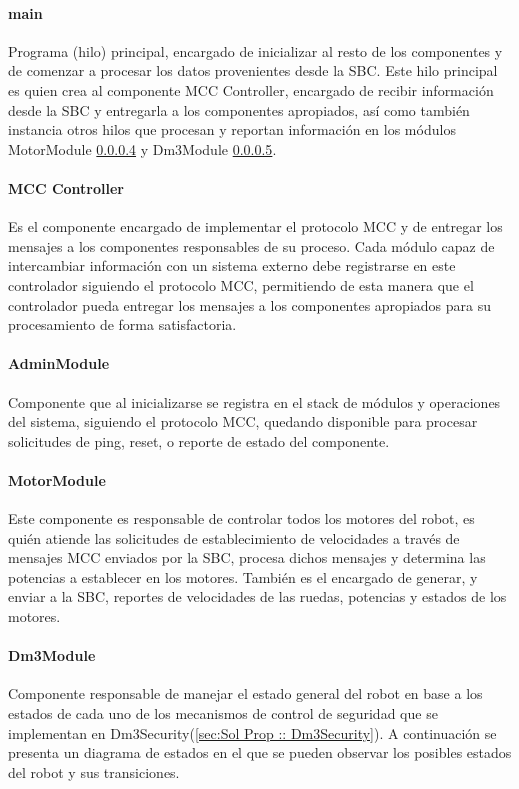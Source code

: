 \documentclass[withindex,glossary]{cam-thesis}
\begin{document}
\paragraph{main}
Programa (hilo) principal, encargado de inicializar al resto de los componentes y de comenzar a procesar los datos provenientes desde la \gls{SBC}. Este hilo principal es quien crea al componente MCC Controller, encargado de recibir información desde la \gls{SBC} y entregarla a los componentes apropiados, así como también instancia otros hilos que procesan y reportan información en los módulos MotorModule \ref{sec: Sol Prop :: MotorModule} y Dm3Module \ref{Sol Prop :: Dm3Module}.

\paragraph{MCC Controller}
Es el componente encargado de implementar el protocolo MCC y de entregar los mensajes a los componentes responsables de su proceso. Cada módulo capaz de intercambiar información con un sistema externo debe registrarse en este controlador siguiendo el protocolo MCC, permitiendo de esta manera que el controlador pueda entregar los mensajes a los componentes apropiados para su procesamiento de forma satisfactoria.

\paragraph{AdminModule}
Componente que al inicializarse se registra en el stack de módulos y operaciones del sistema, siguiendo el protocolo MCC, quedando disponible para procesar solicitudes de ping, reset, o reporte de estado del componente.

\paragraph{MotorModule} \label{sec: Sol Prop :: MotorModule}
Este componente es responsable de controlar todos los motores del robot, es quién atiende las solicitudes de establecimiento de velocidades a través de mensajes MCC enviados por la \gls{SBC}, procesa dichos mensajes y determina las potencias a establecer en los motores. También es el encargado de generar, y enviar a la \gls{SBC}, reportes de velocidades de las ruedas, potencias y estados de los motores.

\paragraph{Dm3Module} \label{Sol Prop :: Dm3Module}
Componente responsable de manejar el estado general del robot en base a los estados de cada uno de los mecanismos de control de seguridad que se implementan en Dm3Security(\ref{sec:Sol Prop :: Dm3Security}). A continuación se presenta un diagrama de estados en el que se pueden observar los posibles estados del robot y sus transiciones.
\end{document}
